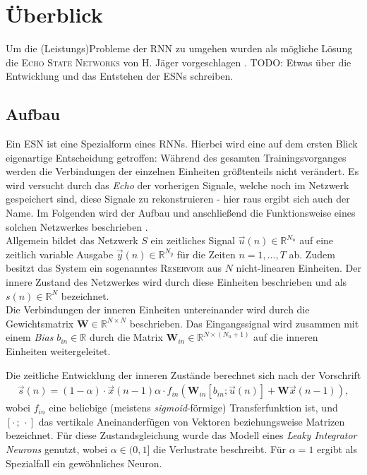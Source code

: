 \section{Überblick}
Um die (Leistungs)Probleme der \textsc{RNN} zu umgehen wurden als mögliche Lösung die \textsc{Echo State Networks} von H. Jäger vorgeschlagen \cite{jaeger2010}.
\textsc{TODO}: Etwas über die Entwicklung und das Entstehen der ESNs schreiben.

\subsection{Aufbau}
Ein \textsc{ESN} ist eine Spezialform eines \textsc{RNN}s. Hierbei wird eine auf dem ersten Blick eigenartige Entscheidung getroffen: Während des gesamten Trainingsvorganges werden die Verbindungen der einzelnen Einheiten größtenteils nicht verändert. Es wird versucht durch das \textit{Echo} der vorherigen Signale, welche noch im Netzwerk gespeichert sind, diese Signale zu rekonstruieren - hier raus ergibt sich auch der Name. Im Folgenden wird der Aufbau und anschließend die Funktionsweise eines solchen Netzwerkes beschrieben \cite{lukoseviciusa2009}.\\

Allgemein bildet das Netzwerk $S$ ein zeitliches Signal $\vec{u}(n) \in \mathbb{R}^{N_u}$  auf eine zeitlich variable Ausgabe $\vec{y}(n) \in \mathbb{R}^{N_y}$ für die Zeiten $n=1, ..., T$ ab. Zudem besitzt das System ein sogenanntes \textsc{Reservoir} aus $N$ nicht-linearen Einheiten. Der innere Zustand des Netzwerkes wird durch diese Einheiten beschrieben und als $s(n) \in \mathbb{R}^{N}$ bezeichnet.\\
Die Verbindungen der inneren Einheiten untereinander wird durch die Gewichtsmatrix $\mathbf{W} \in \mathbb{R}^{N \times N}$ beschrieben. Das Eingangssignal wird zusammen mit einem \textit{Bias} $b_{in} \in \mathbb{R}$ durch die Matrix $\mathbf{W}_{in} \in \mathbb{R}^{N \times (N_u+1)}$ auf die inneren Einheiten weitergeleitet.

Die zeitliche Entwicklung der inneren Zustände berechnet sich nach der Vorschrift
\begin{align}
\label{eq:esn_stateeq}
\vec{s}(n) = (1 - \alpha) \cdot \vec{x}(n-1)  \alpha \cdot f_{in}\left( \mathbf{W}_{in} [b_{in}; \vec{u}(n)] + \mathbf{W} \vec{x}(n-1) \right),
\end{align}
wobei $f_{in}$ eine beliebige (meistens \textit{sigmoid}-förmige) Transferfunktion ist, und $[\cdot\,;\,\cdot]$ das vertikale Aneinanderfügen von Vektoren beziehungsweise Matrizen bezeichnet. Für diese Zustandsgleichung wurde das Modell eines \textit{Leaky Integrator Neurons} genutzt, wobei $\alpha \in (0,1]$ die Verlustrate beschreibt. Für $\alpha=1$ ergibt als Spezialfall ein gewöhnliches Neuron.

